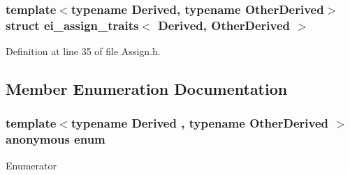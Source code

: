 \subsubsection*{template$<$typename Derived, typename Other\-Derived$>$struct ei\-\_\-assign\-\_\-traits$<$ Derived, Other\-Derived $>$}



Definition at line 35 of file Assign.\-h.



\subsection{Member Enumeration Documentation}
\hypertarget{structei__assign__traits_adb76bc7019909f60a44d8c2711217dd6}{\subsubsection[{anonymous enum}]{\setlength{\rightskip}{0pt plus 5cm}template$<$typename Derived , typename Other\-Derived $>$ anonymous enum}}\label{structei__assign__traits_adb76bc7019909f60a44d8c2711217dd6}
\begin{Desc}
\item[Enumerator]\par
\begin{description}
\item[{\em 
\hypertarget{structei__assign__traits_adb76bc7019909f60a44d8c2711217dd6a8a8e85068577b3ba4e30e01580553190}{Dst\-Is\-Aligned}\label{structei__assign__traits_adb76bc7019909f60a44d8c2711217dd6a8a8e85068577b3ba4e30e01580553190}
}]\item[{\em 
\hypertarget{structei__assign__traits_adb76bc7019909f60a44d8c2711217dd6af74e9b9d9671572056d8db8e0a64bbf0}{Src\-Is\-Aligned}\label{structei__assign__traits_adb76bc7019909f60a44d8c2711217dd6af74e9b9d9671572056d8db8e0a64bbf0}
}]\item[{\em 
\hypertarget{structei__assign__traits_adb76bc7019909f60a44d8c2711217dd6a1dfdd57f6e3f9359556f3b15ac5f2f0c}{Src\-Alignment}\label{structei__assign__traits_adb76bc7019909f60a44d8c2711217dd6a1dfdd57f6e3f9359556f3b15ac5f2f0c}
}]\end{description}
\end{Desc}


